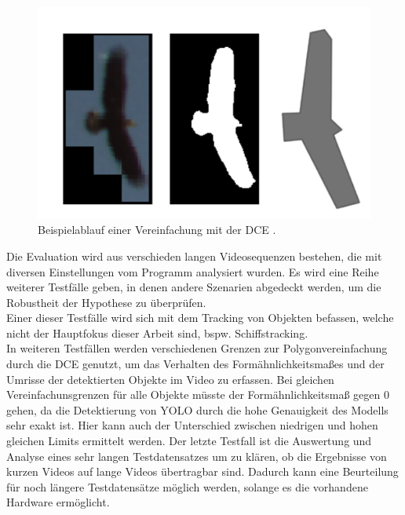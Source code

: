 {\begin{figure}[ht]
	\vspace{-0.5cm}
	   \centering
	   \includegraphics*[scale = 0.5, keepaspectratio, trim=2 2 2 2 ]{images/Example_bird.png}
	   \caption[Beispielablauf der Segmentierung und DCE]{Beispielablauf einer Vereinfachung mit der DCE \citep{Dorr2017}.}
	   \label{Bsp_Dorr}
\end{figure}
Die Evaluation wird aus verschieden langen Videosequenzen bestehen, die mit diversen Einstellungen vom Programm analysiert wurden. Es wird eine Reihe weiterer Testfälle geben, in denen andere Szenarien abgedeckt werden, um die Robustheit der Hypothese zu überprüfen. \\
Einer dieser Testfälle wird sich mit dem Tracking von Objekten befassen, welche nicht der Hauptfokus dieser Arbeit sind, bspw. Schiffstracking. \\
In weiteren Testfällen werden verschiedenen Grenzen zur Polygonvereinfachung durch die DCE genutzt, um das Verhalten des Formähnlichkeitsmaßes und der Umrisse der detektierten Objekte im Video zu erfassen. Bei gleichen Vereinfachunsgrenzen für alle Objekte müsste der Formähnlichkeitsmaß gegen 0 gehen, da die Detektierung von YOLO durch die hohe Genauigkeit des Modells sehr exakt ist. Hier kann auch der Unterschied zwischen niedrigen und hohen gleichen Limits ermittelt werden. Der letzte Testfall ist die Auswertung und Analyse eines sehr langen Testdatensatzes um zu klären, ob die Ergebnisse von kurzen Videos auf lange Videos übertragbar sind. Dadurch kann eine Beurteilung für noch längere Testdatensätze möglich werden, solange es die vorhandene Hardware ermöglicht.



}

